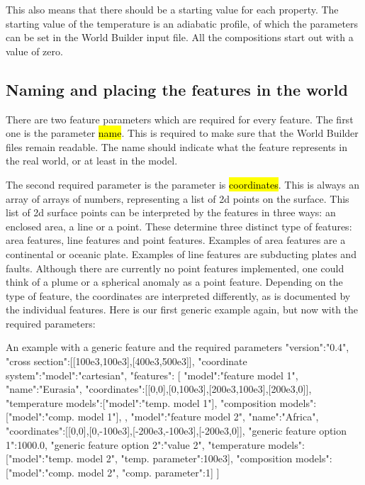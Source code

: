 \documentclass{book}
\newcommand{\WB}{{World Builder}}
\begin{document}
This also means that there should be a starting value for each property. The starting value of the temperature is an adiabatic profile, of which the parameters can be set in the \WB{} input file. All the compositions start out with a value of zero.

\subsection{Naming and placing the features in the world}
There are two feature parameters which are required for every feature. The first one is the parameter \hl{name}. This is required to make sure that the \WB{} files remain readable. The name should indicate what the feature represents in the real world, or at least in the model. 

The second required parameter is the parameter is \hl{coordinates}. This is always an array of arrays of numbers, representing a list of 2d points on the surface. This list of 2d surface points can be interpreted by the features in three ways: an enclosed area, a line or a point. These determine three distinct type of features: area features, line features and point features. Examples of area features are a continental or oceanic plate. Examples of line features are subducting plates and faults. Although there are currently no point features implemented, one could think of a plume or a spherical anomaly as a point feature. Depending on the type of feature, the coordinates are interpreted differently, as is documented by the individual features. Here is our first generic example again, but now with the required parameters:

\begin{javascriptcode}{An example with a generic feature and the required parameters}{}
{
  "version":"0.4",
  "cross section":[[100e3,100e3],[400e3,500e3]],
  "coordinate system":{"model":"cartesian"},
  "features":
  [
    {
      "model":"feature model 1",
      "name":"Eurasia",
      "coordinates":[[0,0],[0,100e3],[200e3,100e3],[200e3,0]],
      "temperature models":[{"model":"temp. model 1"}],
      "composition models":[{"model":"comp. model 1"}],
    },
    {
      "model":"feature model 2",
      "name":"Africa",
      "coordinates":[[0,0],[0,-100e3],[-200e3,-100e3],[-200e3,0]],
      "generic feature option 1":1000.0,
      "generic feature option 2":"value 2",
      "temperature models":[{"model":"temp. model 2", "temp. parameter":100e3}],
      "composition models":[{"model":"comp. model 2", "comp. parameter":1}]
    }
  ]
}
\end{javascriptcode}
\end{document}
